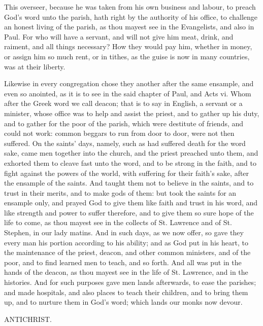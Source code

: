 This overseer, because he was taken from his own 
business and labour, to preach God's word unto the 
parish, hath right by the authority of his office, to challenge
an honest living of the parish, as thou mayest see 
in the Evangelists, and also in Paul. For who will have 
a servant, and will not give him meat, drink, and raiment, 
and all things necessary? How they would pay him, 
whether in money, or assign him so much rent, or in 
tithes, as the guise is now in many countries, was at their 
liberty. 

Likewise in every congregation chose they another after 
the same ensample, and even so anointed, as it is to see 
in the said chapter of Paul, and Acts vi. Whom after 
the Greek word we call deacon; that is to say in English, 
a servant or a minister, whose office was to help and assist
the priest, and to gather up his duty, and to gather for 
the poor of the parish, which were destitute of friends, 
and could not work: common beggars to run from door 
to door, were not then suffered. On the saints' days, 
namely, such as had suffered death for the word sake, 
came men together into the church, and the priest preached 
unto them, and exhorted them to cleave fast unto the word, 
and to be strong in the faith, and to fight against the 
powers of the world, with suffering for their faith's sake, 
after the ensample of the saints. And taught them not to 
believe in the saints, and to trust in their merits, and to 
make gods of them: but took the saints for an ensample 
only, and prayed God to give them like faith and trust 
in his word, and like strength and power to suffer therefore,
and to give them so sure hope of the life to come, as 
thou mayest see in the collects of St. Lawrence and of St. 
Stephen, in our lady matins. And in such days, as we 
now offer, so gave they every man his portion according 
to his ability; and as God put in his heart, to the maintenance
of the priest, deacon, and other common ministers,
and of the poor, and to find learned men to teach, 
and so forth. And all was put in the hands of the deacon, 
as thou mayest see in the life of St. Lawrence, and in the 
histories. And for such purposes gave men lands afterwards,
to ease the parishes; and made hospitals, and also 
places to teach their children, and to bring them up, and 
to nurture them in God's word; which lands our monks 
now devour. 


ANTICHRIST.

